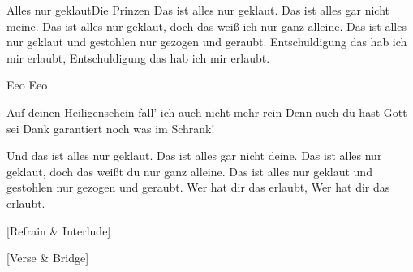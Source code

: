\begin{song}{Alles nur geklaut}{Die Prinzen}{}
Das ist alles nur geklaut. Das ist alles gar nicht meine.
Das ist alles nur geklaut, doch das weiß ich nur ganz alleine.
Das ist alles nur geklaut und gestohlen nur gezogen und geraubt.
Entschuldigung das hab ich mir erlaubt, Entschuldigung das hab ich mir erlaubt.

        Eeo         Eeo

 Auf deinen Heiligenschein fall' ich auch nicht mehr rein
 Denn auch du hast Gott sei Dank garantiert noch was im Schrank!

Und das ist alles nur geklaut. Das ist alles gar nicht deine.
Das ist alles nur geklaut, doch das weißt du nur ganz alleine.
Das ist alles nur geklaut und gestohlen nur gezogen und geraubt.
              Wer hat dir das erlaubt,                Wer hat dir das erlaubt.








              [Refrain & Interlude]



[Verse & Bridge]
\end{song}